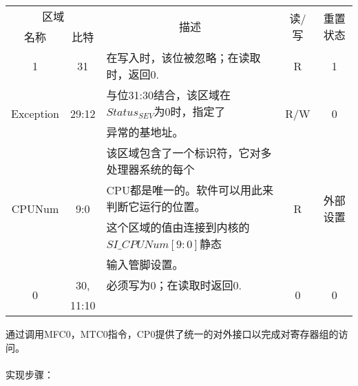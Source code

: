 \begin{table}[H]
\centering
\begin{tabular}{|c|c|c|c|c|}
\hline
\multicolumn{2}{|c|}{区域}&
\multirow{2}{*}{描述}&
\multirow{2}{*}{读/写}&
\multirow{2}{*}{重置状态}\\
\cline{1-2}
名称&比特&&&\\
\hline
1&31&
\multicolumn{1}{l|}{在写入时，该位被忽略；在读取时，返回0.}&
R&1\\
\hline
\multirow{2}{*}{Exception}&
\multirow{2}{*}{29:12}&
\multicolumn{1}{l|}{与位31:30结合，该区域在$Status_{SEV}$为0时，指定了}&
\multirow{2}{*}{R/W}&
\multirow{2}{*}{0}\\
&&
\multicolumn{1}{l|}{异常的基地址。}&
&\\
\hline
\multirow{4}{*}{CPUNum}&
\multirow{4}{*}{9:0}&
\multicolumn{1}{l|}{该区域包含了一个标识符，它对多处理器系统的每个}&
\multirow{4}{*}{R}&
\multirow{4}{*}{外部设置}\\
&&
\multicolumn{1}{l|}{CPU都是唯一的。软件可以用此来判断它运行的位置。}&
&\\
&&
\multicolumn{1}{l|}{这个区域的值由连接到内核的$SI\_CPUNum[9:0]$静态}&
&\\
&&
\multicolumn{1}{l|}{输入管脚设置。}&
&\\
\hline
\multirow{2}{*}{0}&
30,&
\multicolumn{1}{l|}{必须写为0；在读取时返回0.}&
\multirow{2}{*}{0}&
\multirow{2}{*}{0}\\
&11:10&&&\\
\hline
\end{tabular}
\end{table}

通过调用MFC0，MTC0指令，CP0提供了统一的对外接口以完成对寄存器组的访问。\\\\
实现步骤：

